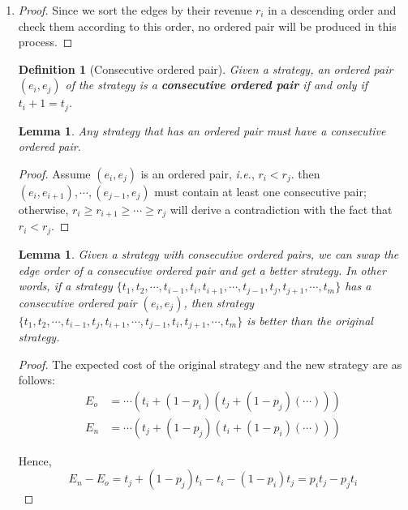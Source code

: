 \documentclass{oxmathproblems}
\makeatletter
\newtheorem{lemma}[theorem]{Lemma}
\newtheorem{definition}{Definition}
\theoremstyle{definition}
\renewenvironment{solution}[1][Solution] {\par\pushQED{\qed}\normalfont\topsep6\p@\@plus6\p@\relax\trivlist\item[\hskip\labelsep\bfseries#1\@addpunct{.}]\ignorespaces}{\popQED\endtrivlist\@endpefalse} \makeatother
\makeatother
\begin{document}
\begin{enumerate}
\begin{solution}
	\begin{proof}
	Since we sort the edges by their revenue $r_i$ in a descending order and check them according to this order, no ordered pair will be produced in this process.
	\end{proof}
	\begin{definition}[Consecutive ordered pair]\label{def4} Given a strategy, an ordered pair $(e_i, e_j)$ of the strategy is a \textbf{consecutive ordered pair} if and only if $t_i + 1 = t_j$.
	\end{definition}
	\begin{lemma}\label{lemma4}
		Any strategy that has an ordered pair must have a consecutive ordered pair.
	\end{lemma}
	\begin{proof}
		Assume $(e_i, e_j)$ is an ordered pair, \textit{i.e.}, $r_i < r_j$. then $(e_i, e_{i+1}), \cdots, (e_{j-1}, e_j)$ must contain at least one consecutive pair; otherwise, $r_i \ge r_{i+1} \ge \cdots \ge r_j$ will derive a contradiction with the fact that $r_i < r_j$.
	\end{proof}
	
	\begin{lemma}\label{lemma5}
		Given a strategy with consecutive ordered pairs, we can swap the edge order of a consecutive ordered pair and get a better strategy. In other words, if a strategy $\{t_1, t_2, \cdots, t_{i-1}, t_i, t_{i+1}, \cdots, t_{j-1}, t_j, t_{j+1}, \cdots, t_m\}$ has a consecutive ordered pair $(e_i, e_j)$, then strategy $\{t_1, t_2, \cdots, t_{i-1}, t_j, t_{i+1}, \cdots, t_{j-1}, t_i, t_{j+1}, \cdots, t_m\}$ is better than the original strategy.
	\end{lemma}
	\begin{proof}
		The expected cost of the original strategy and the new strategy are as follows:
		$$
		\begin{aligned}
		E_o &= \cdots(t_i + (1-p_i)(t_j + (1-p_j)(\cdots))) \\
		E_n &= \cdots(t_j + (1-p_j)(t_i + (1-p_i)(\cdots)))
		\end{aligned}
		$$
		
		Hence,
		$$
		E_n - E_o = t_j + (1-p_j)t_i - t_i- (1-p_i)t_j = p_it_j-p_jt_i
		$$
		

\end{proof}
\end{solution}
\end{enumerate}
\end{document}
